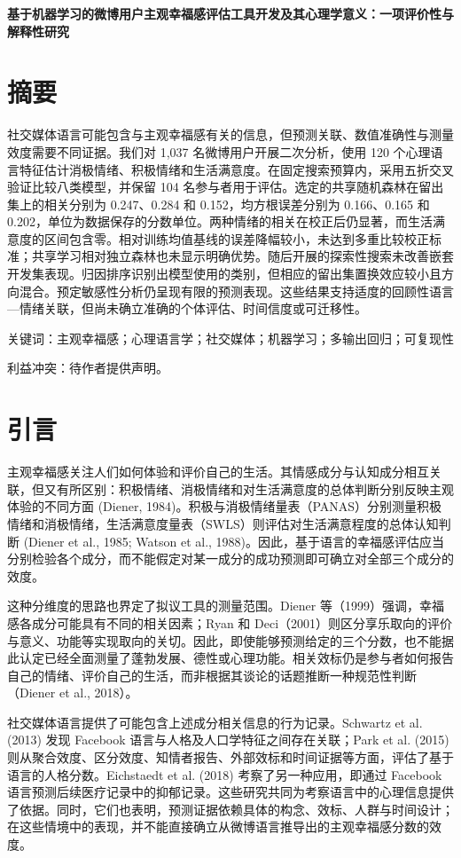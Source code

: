 \documentclass[11pt,letterpaper]{article}
\begin{document}
\begin{center}\fontsize{16}{20}\selectfont\bfseries 基于机器学习的微博用户主观幸福感评估工具开发及其心理学意义：一项评价性与解释性研究\end{center}
\section{摘要}\label{ux6458ux8981}

社交媒体语言可能包含与主观幸福感有关的信息，但预测关联、数值准确性与测量效度需要不同证据。我们对 1,037 名微博用户开展二次分析，使用 120 个心理语言特征估计消极情绪、积极情绪和生活满意度。在固定搜索预算内，采用五折交叉验证比较八类模型，并保留 104 名参与者用于评估。选定的共享随机森林在留出集上的相关分别为 0.247、0.284 和 0.152，均方根误差分别为 0.166、0.165 和 0.202，单位为数据保存的分数单位。两种情绪的相关在校正后仍显著，而生活满意度的区间包含零。相对训练均值基线的误差降幅较小，未达到多重比较校正标准；共享学习相对独立森林也未显示明确优势。随后开展的探索性搜索未改善嵌套开发集表现。归因排序识别出模型使用的类别，但相应的留出集置换效应较小且方向混合。预定敏感性分析仍呈现有限的预测表现。这些结果支持适度的回顾性语言---情绪关联，但尚未确立准确的个体评估、时间信度或可迁移性。

关键词：主观幸福感；心理语言学；社交媒体；机器学习；多输出回归；可复现性

利益冲突：待作者提供声明。

\section{引言}\label{ux5f15ux8a00}

主观幸福感关注人们如何体验和评价自己的生活。其情感成分与认知成分相互关联，但又有所区别：积极情绪、消极情绪和对生活满意度的总体判断分别反映主观体验的不同方面 (Diener, 1984)。积极与消极情绪量表（PANAS）分别测量积极情绪和消极情绪，生活满意度量表（SWLS）则评估对生活满意程度的总体认知判断 (Diener et al., 1985; Watson et al., 1988)。因此，基于语言的幸福感评估应当分别检验各个成分，而不能假定对某一成分的成功预测即可确立对全部三个成分的效度。

这种分维度的思路也界定了拟议工具的测量范围。Diener 等（1999）强调，幸福感各成分可能具有不同的相关因素；Ryan 和 Deci（2001）则区分享乐取向的评价与意义、功能等实现取向的关切。因此，即使能够预测给定的三个分数，也不能据此认定已经全面测量了蓬勃发展、德性或心理功能。相关效标仍是参与者如何报告自己的情绪、评价自己的生活，而非根据其谈论的话题推断一种规范性判断（Diener et al., 2018）。

社交媒体语言提供了可能包含上述成分相关信息的行为记录。Schwartz et al. (2013) 发现 Facebook 语言与人格及人口学特征之间存在关联；Park et al. (2015) 则从聚合效度、区分效度、知情者报告、外部效标和时间证据等方面，评估了基于语言的人格分数。Eichstaedt et al. (2018) 考察了另一种应用，即通过 Facebook 语言预测后续医疗记录中的抑郁记录。这些研究共同为考察语言中的心理信息提供了依据。同时，它们也表明，预测证据依赖具体的构念、效标、人群与时间设计；在这些情境中的表现，并不能直接确立从微博语言推导出的主观幸福感分数的效度。
\end{document}
